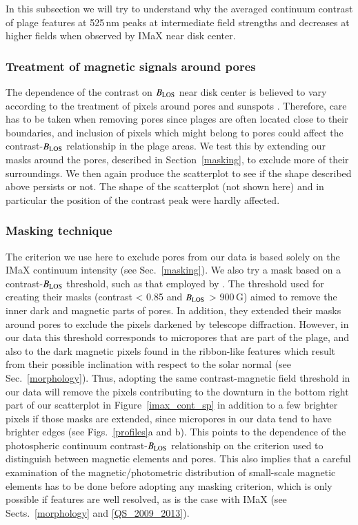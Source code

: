 \documentclass[goettingen, gauss, print]{thesis}
\begin{document}
In this subsection we will try to understand why the averaged continuum contrast of plage features at 525\,nm peaks at intermediate field strengths and decreases at higher fields when observed by IMaX near disk center. 
\subsubsection{Treatment of magnetic signals around pores} 
The dependence of the contrast on $B_{\rm LOS}$ near disk center is believed to vary according to the treatment of pixels around pores and sunspots \citep[]{kobel_continuum_2011,yeo_intensity_2013}. Therefore, care has to be taken when removing pores since plages are often located close to their boundaries, and inclusion of pixels which might belong to pores could affect the contrast-$B_{\rm LOS}$ relationship in the plage areas.
We test this by extending our masks around the pores, described in Section~\ref{masking}, to exclude more of their surroundings. We then again produce the scatterplot to see if the shape described above persists or not. The shape of the scatterplot (not shown here) and in particular the position of the contrast peak were hardly affected. 

\subsubsection{Masking technique}
The criterion we use here to exclude pores from our data is based solely on the IMaX continuum intensity (see Sec.~\ref{masking}).
We also try a mask based on a contrast-$B_{\rm LOS}$ threshold, such as that employed by \cite{kobel_continuum_2011}. The threshold used for creating their masks (contrast < 0.85 and $B_{\rm LOS}$ > 900\,G) aimed to remove the inner dark and magnetic parts of pores. In addition, they extended their masks around pores to exclude the pixels darkened by telescope diffraction. However, in our data this threshold corresponds to micropores that are part of the plage, and also to the dark magnetic pixels found in the ribbon-like features which result from their possible inclination with respect to the solar normal (see Sec.~\ref{morphology}).
Thus, adopting the same contrast-magnetic field threshold in our data will remove the pixels contributing to the downturn in the bottom right part of our scatterplot in Figure~\ref{imax_cont_sp} in addition to a few brighter pixels if those masks are extended, since micropores in our data tend to have brighter edges (see Figs.~\ref{profiles}a and b). This points to the dependence of the photospheric continuum contrast-$B_{\rm LOS}$ relationship on the criterion used to distinguish between magnetic elements and pores. This also implies that a careful examination of the magnetic/photometric distribution of small-scale magnetic elements has to be done before adopting any masking criterion, which is only possible if features are well resolved, as is the case with IMaX (see Sects.~\ref{morphology} and \ref{QS_2009_2013}).  
\end{document}
